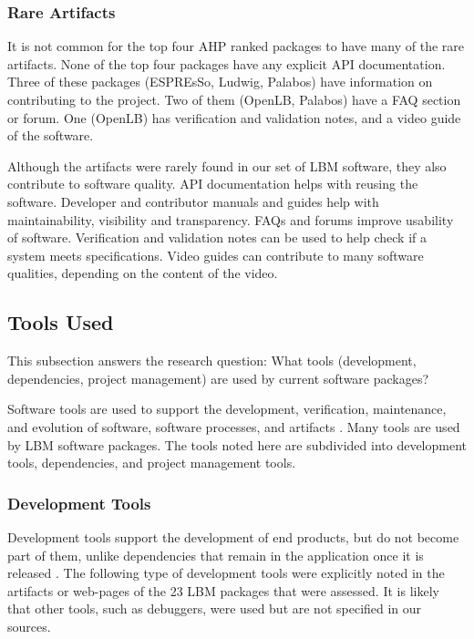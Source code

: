 \documentclass[final, 3p, times, authoryear]{elsarticle}
\begin{document}
\subsubsection{Rare Artifacts}

It is not common for the top four AHP ranked packages to have many of the rare
artifacts. None of the top four packages have any explicit API documentation.
Three of these packages (ESPREsSo, Ludwig, Palabos) have information on
contributing to the project. Two of them (OpenLB, Palabos) have a FAQ section or
forum. One (OpenLB) has verification and validation notes, and a video guide of
the software. 

Although the artifacts were rarely found in our set of LBM software, they also
contribute to software quality. API documentation helps with reusing the
software. Developer and contributor manuals and guides help with
maintainability, visibility and transparency. FAQs and forums improve usability
of software. Verification and validation notes can be used to help check if a
system meets specifications. Video guides can contribute to many software
qualities, depending on the content of the video. 

\subsection{Tools Used} \label{tools}

This subsection answers the research question: What tools (development,
dependencies, project management) are used by current software packages?

Software tools are used to support the development, verification, maintenance,
and evolution of software, software processes, and artifacts
\citep{ghezzi1991fundamentals}. Many tools are used by LBM software packages.
The tools noted here are subdivided into development tools, dependencies, and
project management tools.

\subsubsection{Development Tools}

Development tools support the development of end products, but do not become
part of them, unlike dependencies that remain in the application once it is
released \citep{ghezzi1991fundamentals}. The following type of development tools
were explicitly noted in the artifacts or web-pages of the 23 LBM packages that
were assessed. It is likely that other tools, such as debuggers, were used but
are not specified in our sources.
\end{document}
